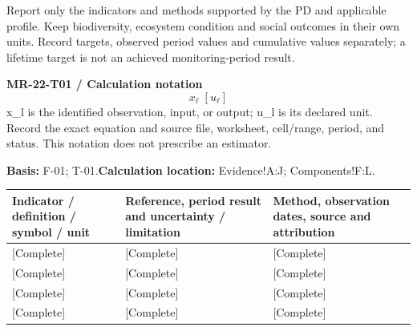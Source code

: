 Report only the indicators and methods supported by the PD and applicable profile. Keep biodiversity, ecosystem condition and social outcomes in their own units. Record targets, observed period values and cumulative values separately; a lifetime target is not an achieved monitoring-period result.\par
{}
\par\begingroup\sffamily\fontsize{8.4}{10.5}\selectfont\color{NEBGreen}
\textbf{MR-22-T01 / Calculation notation}\
{\fontsize{10}{12}\selectfont\[x_{\ell}\;[u_{\ell}]\]}
x\_l is the identified observation, input, or output; u\_l is its declared unit. Record the exact equation and source file, worksheet, cell/range, period, and status. This notation does not prescribe an estimator.\par
\textbf{Basis:} F-01; T-01.\quad\textbf{Calculation location:} Evidence!A:J; Components!F:L.\par\endgroup
{\sffamily\fontsize{8.6}{10.7}\selectfont\begin{longtable}{@{}P{48mm}P{61mm}P{53mm}@{}}
\toprule
\textbf{Indicator / definition / symbol / unit} & \textbf{Reference, period result and uncertainty / limitation} & \textbf{Method, observation dates, source and attribution}\\\midrule\endhead
\rule{0pt}{8mm}[Complete] & [Complete] & [Complete]\\\hline
\rule{0pt}{8mm}[Complete] & [Complete] & [Complete]\\\hline
\rule{0pt}{8mm}[Complete] & [Complete] & [Complete]\\\hline
\rule{0pt}{8mm}[Complete] & [Complete] & [Complete]\\\hline
\end{longtable}}
